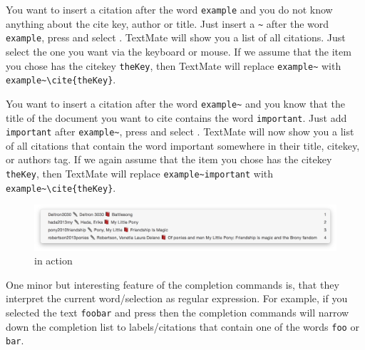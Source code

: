 \documentclass[11pt, x11names]{article}
\begin{document}
\begin{itemize}

    \item You want to insert a citation after the word \texttt{example} and you do not know anything about the cite key, author or title. Just insert a \texttt{\textasciitilde{}} after the word \texttt{example}, press \keys{\Alt + \esc} and select . TextMate will show you a list of all citations. Just select the one you want via the keyboard or mouse. If we assume that the item you chose has the citekey \texttt{theKey}, then TextMate will replace \texttt{example\textasciitilde{}} with \texttt{example\textasciitilde{}\textbackslash{}cite\{theKey\}}.

    \begin{sloppypar}
    \item You want to insert a citation after the word \texttt{example\textasciitilde{}} and you know that the title of the document you want to cite contains the word \texttt{important}. Just add \texttt{important} after \texttt{example\textasciitilde{}}, press \keys{\Alt + \esc} and select . TextMate will now show you a list of all citations that contain the word important somewhere in their title, citekey, or authors tag. If we again assume that the item you chose has the citekey \texttt{theKey}, then TextMate will replace \texttt{example\textasciitilde{}important} with \texttt{example\textasciitilde{}\textbackslash{}cite\{theKey\}}.
    \end{sloppypar}

\end{itemize}

\begin{figure}[h]
  \centering
    \includegraphics[width=\textwidth]{Figures/Citation Completion.png}
  \caption{ in action}
  \label{fig:Figures_Citation_Completion}
\end{figure}

One minor but interesting feature of the completion commands is, that they interpret the current word/selection as regular expression. For example, if you selected the text \texttt{foo\textbar{}bar} and press \keys{\Alt + \esc} then the completion commands will narrow down the completion list to labels/citations that contain one of the words \texttt{foo} or \texttt{bar}.
\end{document}
